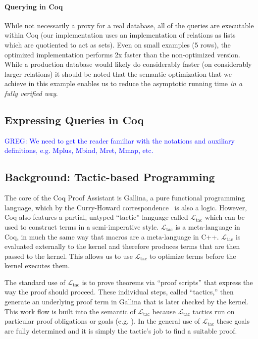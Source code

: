 \documentclass[preprint]{sigplanconf}
\newcommand{\greg}[1]{\textcolor{blue}{GREG: #1}}
\newcommand{\ltac}[0]{\ensuremath{\mathcal{L}_{\mathrm{tac}}}}
\begin{document}
\paragraph{Querying in Coq} While not necessarily a proxy for a real database, all of the queries are executable within Coq (our implementation uses an implementation of relations as lists which are quotiented to act as sets).
Even on small examples (5 rows), the optimized implementation performs 2x faster than the non-optimized version.
While a production database would likely do considerably faster (on considerably larger relations) it should be noted that the semantic optimization that we achieve in this example enables us to reduce the asymptotic running time \emph{in a fully verified way}.

\subsection{Expressing Queries in Coq}

\greg{We need to get the reader familiar with the notations and auxiliary definitions, e.g. Mplus, Mbind, Mret, Mmap, etc.}

\subsection{Background: Tactic-based Programming}
\label{sec:tactic-based}

The core of the Coq Proof Assistant is Gallina, a pure functional programming language, which by the Curry-Howard correspondence~\cite{} is also a logic.
However, Coq also features a partial, untyped ``tactic'' language called \ltac{} which can be used to construct terms in a semi-imperative style.
\ltac{} is a meta-language in Coq, in much the same way that macros are a meta-language in C++.
\ltac{} is evaluated externally to the kernel and therefore produces terms that are then passed to the kernel.
This allows us to use \ltac{} to optimize terms before the kernel executes them.

The standard use of \ltac{} is to prove theorems via ``proof scripts'' that express the way the proof should proceed.
These individual steps, called ``tactics,'' then generate an underlying proof term in Gallina that is later checked by the kernel.
This work flow is built into the semantic of \ltac{} because \ltac{} tactics run on particular proof obligations or goals (e.g. ).
In the general use of \ltac{} these goals are fully determined and it is simply the tactic's job to find a suitable proof.
\end{document}
